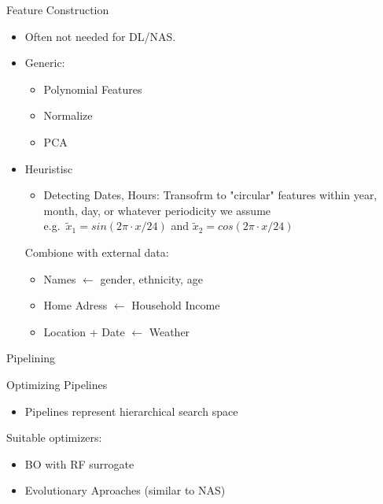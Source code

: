 \begin{frame}{Feature Construction}
  \begin{itemize}
    \item Often not needed for DL/NAS.
    \item Generic:
    \begin{itemize}
      \item Polynomial Features
      \item Normalize 
      \item PCA
    \end{itemize}
    \item Heuristisc
    \begin{itemize}
      \item Detecting Dates, Hours: Transofrm to "circular" features within year, month, day, or whatever periodicity we assume \\
      e.g.\ $\tilde x_1 = sin(2\pi \cdot x /24)$ and $\tilde x_2 = cos(2\pi \cdot x /24)$
    \end{itemize}
    Combione with external data:
    \begin{itemize}
      \item Names $\leftarrow$ gender, ethnicity, age
      \item Home Adress $\leftarrow$ Household Income
      \item Location + Date $\leftarrow$ Weather
    \end{itemize}
  \end{itemize}
    
\end{frame}

\begin{frame}{Pipelining}
  
\end{frame}

\begin{frame}{Optimizing Pipelines}
  \begin{itemize}
    \item Pipelines represent hierarchical search space
  \end{itemize}

  Suitable optimizers:
  \begin{itemize}
    \item BO with RF surrogate
    \item Evolutionary Aproaches (similar to NAS)
  \end{itemize}
    
\end{frame}


